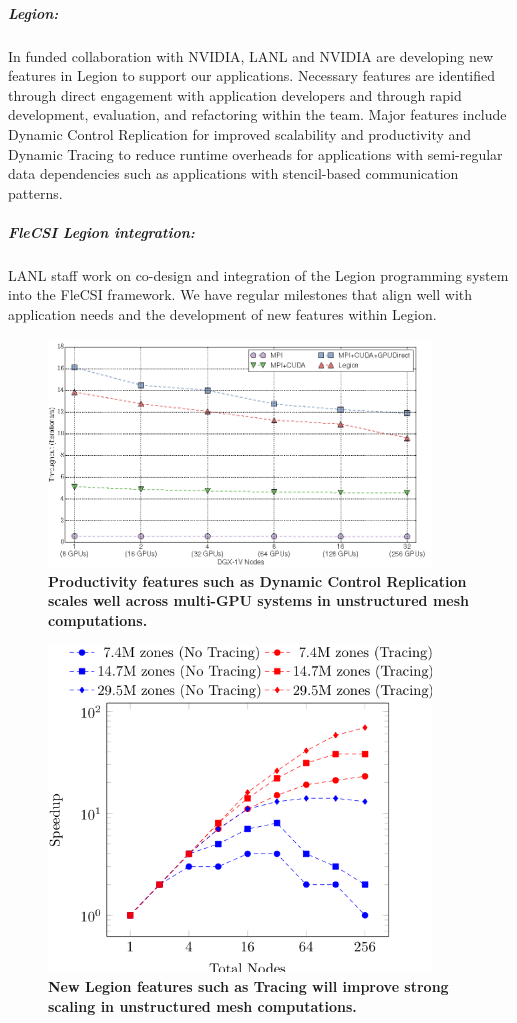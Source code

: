 \subparagraph{Legion:}

In funded collaboration with NVIDIA, LANL and NVIDIA are developing new features in Legion to support our applications. Necessary features are identified through direct engagement with application developers and through rapid development, evaluation, and refactoring within the team. Major features include Dynamic Control Replication for improved scalability and productivity and Dynamic Tracing to reduce runtime overheads for  applications with semi-regular data dependencies such as applications with stencil-based communication patterns. 


\subparagraph{FleCSI Legion integration:}
LANL staff work on co-design and integration of the Legion programming system into the FleCSI framework. We have regular milestones that align well with application needs and the development of new features within Legion. 


\begin{figure}[htb]
  \centering
  \includegraphics[width=4in]{projects/2.3.6-NNSA/2.3.6.01-LANL-ATDM/control-replication-performance}
        \caption{\label{fig:control-replication-performance}\textbf{Productivity features such as Dynamic Control Replication scales well across multi-GPU systems in unstructured mesh computations.}}
\end{figure}

\begin{figure}[htb]
        \centering
        \includegraphics[width=4in]{projects/2.3.6-NNSA/2.3.6.01-LANL-ATDM/tracing-performance}
        \caption{\label{fig:tracing-performance}\textbf{New Legion features such as Tracing will improve strong scaling in unstructured mesh computations.}}
\end{figure}



